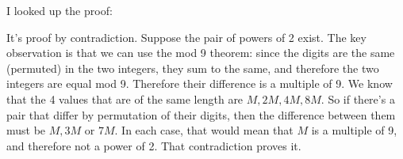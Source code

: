 \documentclass[12pt]{article}
\begin{document}
\begin{mdframed}
  I looked up the proof:

  It's proof by contradiction. Suppose the pair of powers of 2 exist. The key
  observation is that we can use the mod 9 theorem: since the digits are the
  same (permuted) in the two integers, they sum to the same, and therefore the
  two integers are equal mod 9. Therefore their difference is a multiple of
  9. We know that the 4 values that are of the same length are $M, 2M, 4M,
  8M$. So if there's a pair that differ by permutation of their digits, then
  the difference between them must be $M, 3M$ or $7M$. In each case, that would
  mean that $M$ is a multiple of 9, and therefore not a power of 2. That
  contradiction proves it.

\end{mdframed}
\end{document}
